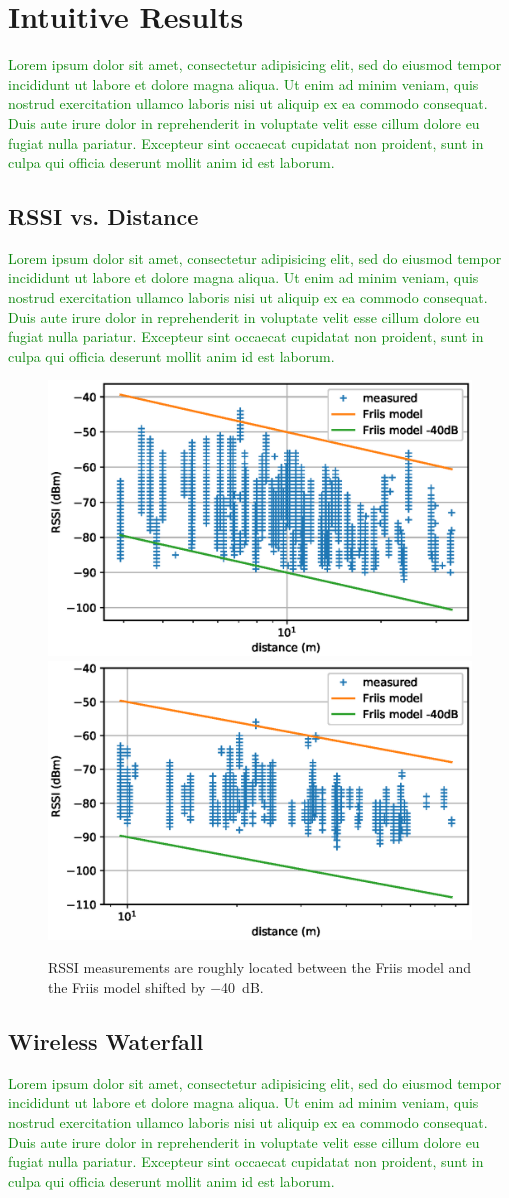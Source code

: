 \documentclass{elsarticle}
\newcommand{\lorem}          {\textcolor{green}{Lorem ipsum dolor sit amet, consectetur adipisicing elit, sed do eiusmod tempor incididunt ut labore et dolore magna aliqua. Ut enim ad minim veniam, quis nostrud exercitation ullamco laboris nisi ut aliquip ex ea commodo consequat. Duis aute irure dolor in reprehenderit in voluptate velit esse cillum dolore eu fugiat nulla pariatur. Excepteur sint occaecat cupidatat non proident, sunt in culpa qui officia deserunt mollit anim id est laborum.}}
\begin{document}
\section{Intuitive Results}
\label{sec:intuitive}

\lorem

\subsection{RSSI vs. Distance}
\label{sec:rssi_distance}

\lorem

\begin{figure}[h]
    \includegraphics[width=0.5\columnwidth]{pister_hack.eps}
    \includegraphics[width=0.5\columnwidth]{pister_hack_peach.eps}
    \caption{RSSI measurements are roughly located between the Friis model and the Friis model shifted by $-$40~dB.}
    \label{fig:pister_hack}
\end{figure}

\subsection{Wireless Waterfall}
\label{sec:waterfall}


\lorem

\end{document}
